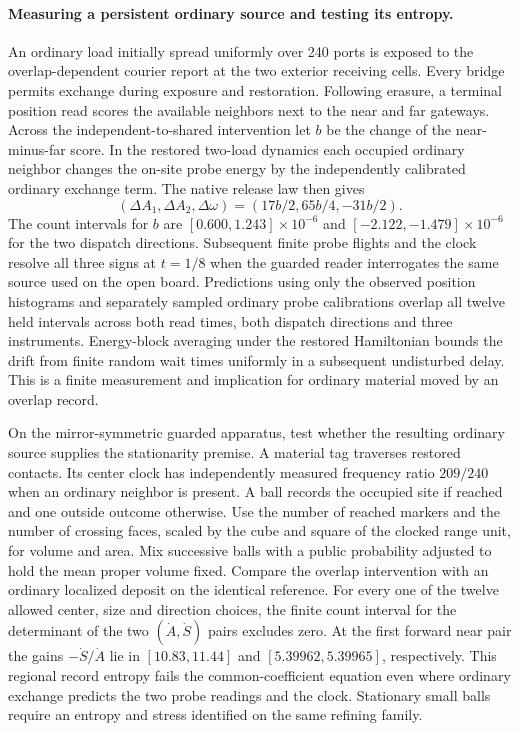 \documentclass[11pt]{article}
\begin{document}
\paragraph{Measuring a persistent ordinary source and testing its entropy.}
An ordinary load initially spread uniformly over 240 ports is exposed
to the overlap-dependent courier report at the two exterior receiving cells.
Every bridge permits exchange during exposure and restoration. Following
erasure, a terminal position read scores the available neighbors next to the
near and far gateways. Across the independent-to-shared intervention
let $b$ be the change of the near-minus-far score. In the restored
two-load dynamics each occupied ordinary neighbor changes the on-site
probe energy by the independently calibrated ordinary exchange term.
The native release law then gives
\[
   (\Delta A_1,\Delta A_2,\Delta\omega)=(17b/2,65b/4,-31b/2).
\]
The count intervals for $b$ are $[0.600,1.243]\times10^{-6}$ and
$[-2.122,-1.479]\times10^{-6}$ for the two dispatch directions.
Subsequent finite probe flights and the clock resolve all three signs
at $t=1/8$ when the guarded reader interrogates the same source used on the open board.
Predictions using only the observed position histograms and separately
sampled ordinary probe calibrations overlap all twelve held intervals
across both read times, both dispatch directions and three instruments.
Energy-block averaging under the restored Hamiltonian bounds the drift
from finite random wait times uniformly in a subsequent undisturbed delay.
This is a finite measurement and implication for ordinary material moved
by an overlap record.

On the mirror-symmetric guarded apparatus, test whether the resulting
ordinary source supplies the stationarity premise. A material tag
traverses restored contacts. Its center clock has independently measured
frequency ratio $209/240$ when an ordinary neighbor is present. A ball
records the occupied site if reached and one outside outcome otherwise.
Use the number of reached markers and the number of crossing faces,
scaled by the cube and square of the clocked range unit, for volume and
area. Mix successive balls with a public probability adjusted to hold
the mean proper volume fixed. Compare the overlap intervention with an
ordinary localized deposit on the identical reference. For every one
of the twelve allowed center, size and direction choices, the finite
count interval for the determinant of the two $(\dot A,\dot S)$ pairs
excludes zero. At the first forward near pair the gains
$-\dot S/\dot A$ lie in $[10.83,11.44]$ and $[5.39962,5.39965]$,
respectively. This regional record entropy fails the common-coefficient
equation even where ordinary exchange predicts the two probe readings
and the clock. Stationary small balls require an entropy and stress
identified on the same refining family.
\end{document}
